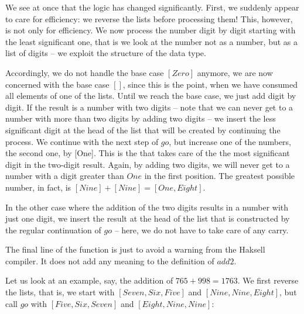 \documentclass{scrreprt}
\newcommand{\Conid}[1]{\mathit{#1}}
\newcommand{\Varid}[1]{\mathit{#1}}
\begin{document}
We see at once that the logic has changed significantly.
First, we suddenly appear to care for efficiency:
we reverse the lists before processing them!
This, however, is not only for efficiency.
We now process the number digit by digit starting
with the least significant one,
that is we look at the number not as a number,
but as a list of digits --
we exploit the structure of the data type.

Accordingly, we do not handle the base case $[Zero]$ anymore,
we are now concerned with the base case $[]$,
since this is the point, when we have consumed
all elements of one of the lists.
Until we reach the base case, we just add digit by digit.
If the result is a number with two digits --
note that we can never get to a number
with more than two digits by adding two digits --
we insert the less significant digit at the head of 
the list that will be created by continuing the process.
We continue with the next step of $go$, 
but increase one of the numbers, the second one,
by [One]. 
This is the  that takes care
of the the most significant digit in 
the two-digit result.
Again, by adding two digits, 
we will never get to a number with a digit
greater than \ensuremath{\Conid{One}} in the first position. 
The greatest possible number, in fact, is
$[Nine] + [Nine] = [One,Eight]$.

In the other case where the addition of the two digits
results in a number with just one digit,
we insert the result at the head
of the list that is constructed
by the regular continuation of $go$
-- here, we do not have to take care of any carry.

The final line of the function
is just to avoid a warning from the Haksell compiler.
It does not add any meaning to the definition of \ensuremath{\Varid{add2}}.

Let us look at an example, say,
the addition of $765 + 998 = 1763$.
We first reverse the lists, 
that is, we start with $[Seven,Six,Five]$ and
$[Nine, Nine, Eight]$,
but call $go$ with 
$[Five,Six,Seven]$ and $[Eight,Nine,Nine]$:
\end{document}
